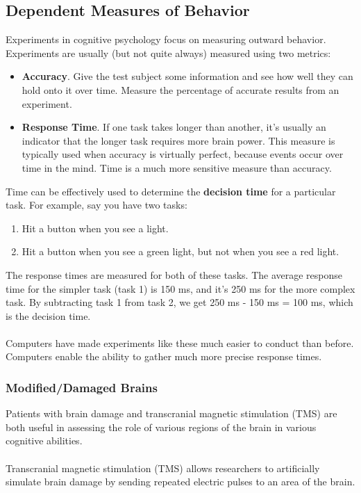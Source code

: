 \documentclass[]{article}
\begin{document}
		\subsection{Dependent Measures of Behavior}
			Experiments in cognitive psychology focus on measuring outward behavior. Experiments are usually (but not quite always) measured using two metrics:
			\begin{itemize}
				\item \textbf{Accuracy}. Give the test subject some information and see how well they can hold onto it over time. Measure the percentage of accurate results from an experiment.
				\item \textbf{Response Time}. If one task takes longer than another, it's usually an indicator that the longer task requires more brain power. This measure is typically used when accuracy is virtually perfect, because events occur over time in the mind. Time is a much more sensitive measure than accuracy.
			\end{itemize}

			Time can be effectively used to determine the \textbf{decision time} for a particular task. For example, say you have two tasks:
			\begin{enumerate}
				\item Hit a button when you see a light.
				\item Hit a button when you see a green light, but not when you see a red light.
			\end{enumerate}

			The response times are measured for both of these tasks. The average response time for the simpler task (task 1) is 150 ms, and it's 250 ms for the more complex task. By subtracting task 1 from task 2, we get 250 ms - 150 ms = 100 ms, which is the decision time.
			\\ \\
			Computers have made experiments like these much easier to conduct than before. Computers enable the ability to gather much more precise response times.
			\subsubsection{Modified/Damaged Brains}
				Patients with brain damage and transcranial magnetic stimulation (TMS) are both useful in assessing the role of various regions of the brain in various cognitive abilities.
				\\ \\
				Transcranial magnetic stimulation (TMS) allows researchers to artificially simulate brain damage by sending repeated electric pulses to an area of the brain.
\end{document}
